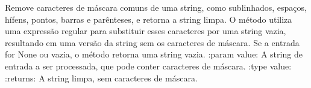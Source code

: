 \documentclass[letterpaper,10pt,english]{sphinxmanual}
\begin{document}

\begin{fulllineitems}
\label{\detokenize{api/formatters:formatters.strip_mask_chars}}
\pysigstartsignatures
\pysiglinewithargsret
{}
{}
{}
\pysigstopsignatures
\sphinxAtStartPar
Remove caracteres de máscara comuns de uma string, como sublinhados, espaços, hífens, pontos, barras e parênteses, e retorna a string limpa. O método utiliza uma expressão regular para substituir esses caracteres por uma string vazia, resultando em uma versão da string sem os caracteres de máscara. Se a entrada for None ou vazia, o método retorna uma string vazia.
:param value: A string de entrada a ser processada, que pode conter caracteres de máscara.
:type value: 
:returns: A string limpa, sem caracteres de máscara.
\begin{quote}\begin{description}
\sphinxAtStartPar
{}

\end{description}\end{quote}

\end{fulllineitems}

\end{document}
